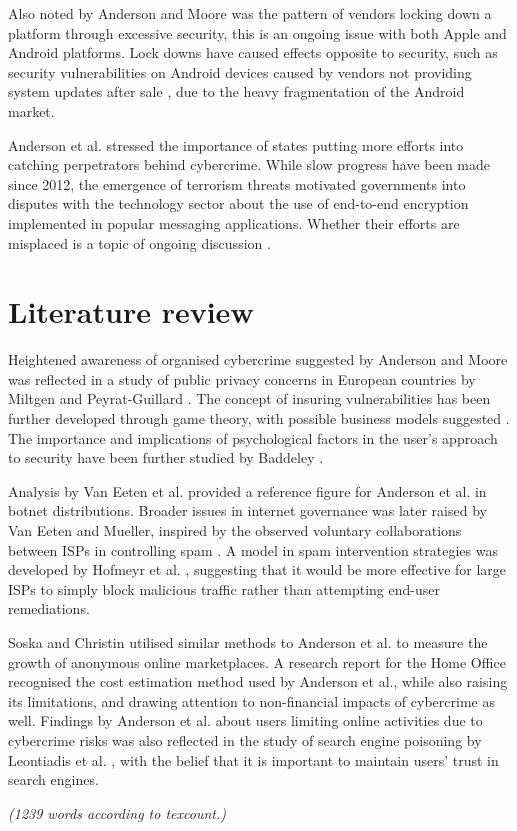 \documentclass[11pt]{article}
\begin{document}
Also noted by Anderson and Moore \cite[Sec. 3]{anderson2009information} was the pattern of vendors locking down a platform through excessive security, this is an ongoing issue with both Apple and Android platforms. Lock downs have caused effects opposite to security, such as security vulnerabilities on Android devices caused by vendors not providing system updates after sale \cite{zhou2014peril}, due to the heavy fragmentation of the Android market.

Anderson et al. \cite[12.6]{anderson2013measuring} stressed the importance of states putting more efforts into catching perpetrators behind cybercrime. While slow progress have been made since 2012, the emergence of terrorism threats motivated governments into disputes with the technology sector about the use of end-to-end encryption implemented in popular messaging applications. Whether their efforts are misplaced is a topic of ongoing discussion \cite{cryptowar}.

\section{Literature review}

Heightened awareness of organised cybercrime suggested by Anderson and Moore \cite{anderson2009information} was reflected in a study of public privacy concerns in European countries by Miltgen and Peyrat-Guillard \cite{miltgen2014cultural}. The concept of insuring vulnerabilities has been further developed through game theory, with possible business models suggested \cite{pal2012cyberinsurance}. The importance and implications of psychological factors in the user's approach to security have been further studied by Baddeley \cite{baddeley2011information}.

Analysis by Van Eeten et al. \cite{van2010role} provided a reference figure for Anderson et al. \cite[12.4.1]{anderson2013measuring} in botnet distributions. Broader issues in internet governance was later raised by Van Eeten and Mueller, inspired by the observed voluntary collaborations between ISPs in controlling spam \cite[p. 730]{van2013governance}. A model in spam intervention strategies was developed by Hofmeyr et al. \cite{hofmeyr2013modeling}, suggesting that it would be more effective for large ISPs to simply block malicious traffic rather than attempting end-user remediations. 

Soska and Christin \cite{soska2015measuring} utilised similar methods to Anderson et al. \cite{anderson2013measuring} to measure the growth of anonymous online marketplaces. A research report for the Home Office \cite{mcguire2013cyber} recognised the cost estimation method used by Anderson et al., while also raising its limitations, and drawing attention to non-financial impacts of cybercrime as well. Findings by Anderson et al. about users limiting online activities due to cybercrime risks \cite[12.3.2]{anderson2013measuring} was also reflected in the study of search engine poisoning by Leontiadis et al. \cite{leontiadis2014nearly}, with the belief that it is important to maintain users' trust in search engines.

\emph{(1239 words according to texcount.)}


\footnotesize{}
\end{document}
